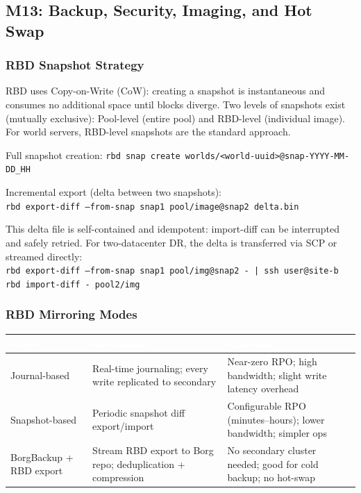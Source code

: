 \documentclass[11pt,letterpaper]{article}
\newcommand{\tableheader}[1]{\textbf{\sffamily\textcolor{white}{#1}}}
\begin{document}
\subsection{M13: Backup, Security, Imaging, and Hot Swap}

\subsubsection{RBD Snapshot Strategy}

RBD uses Copy-on-Write (CoW): creating a snapshot is instantaneous and consumes no additional space until blocks diverge. Two levels of snapshots exist (mutually exclusive): Pool-level (entire pool) and RBD-level (individual image). For world servers, RBD-level snapshots are the standard approach.

Full snapshot creation: \texttt{rbd snap create worlds/<world-uuid>@snap-YYYY-MM-DD\_HH}

Incremental export (delta between two snapshots): \\ \texttt{rbd export-diff --from-snap snap1 pool/image@snap2 delta.bin}

This delta file is self-contained and idempotent: import-diff can be interrupted and safely retried. For two-datacenter DR, the delta is transferred via SCP or streamed directly: \\ \texttt{rbd export-diff --from-snap snap1 pool/img@snap2 - | ssh user@site-b rbd import-diff - pool2/img}

\subsubsection{RBD Mirroring Modes}

\begin{center}
\begin{tabularx}{\textwidth}{L{3.5cm}XX}
\toprule
{}
\tableheader{Mode} & \tableheader{Mechanism} & \tableheader{Tradeoffs} \\
\midrule
Journal-based & Real-time journaling; every write replicated to secondary & Near-zero RPO; high bandwidth; slight write latency overhead \\
Snapshot-based & Periodic snapshot diff export/import & Configurable RPO (minutes--hours); lower bandwidth; simpler ops \\
BorgBackup + RBD export & Stream RBD export to Borg repo; deduplication + compression & No secondary cluster needed; good for cold backup; no hot-swap \\
\bottomrule
\end{tabularx}
\end{center}
\end{document}
